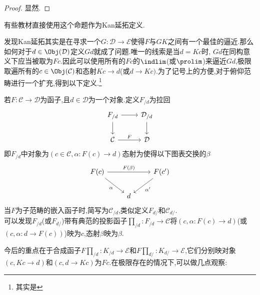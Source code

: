 \begin{proof}
    显然.
\end{proof}
\begin{remark}
    有些教材直接使用这个命题作为Kan延拓定义.
\end{remark}
发现Kan延拓其实是在寻求一个$G : \mathcal{D} \to \mathcal{E}$使得$F$与$GK$之间有一个最佳的逼近.那么如何对于$d \in \Obj(\mathcal{D})$定义$Gd$就成了问题.唯一的线索是当$d = Kc$时, $Gd$在同构意义下应当被取为$Fc$.因此可以使用所有的$Fc$的$\indlim$(或$\prolim$)来逼近$Gd$,极限取遍所有的$c \in \Obj(\mathcal{C})$和态射$Kc \to d$(或$d \to Kc)$.为了记号上的方便,对于俯仰范畴进行一个扩充,得到以下定义.\footnote{其实是\parencite[定义1.6.2]{李文威卷二}}
\begin{definition}
    若$F : \mathcal{C} \to \mathcal{D}$为函子,且$d \in \mathcal{D}$为一个对象.定义$F_{/d}$为拉回
    \[\begin{tikzcd}
	{F_{/d}} & {\mathcal{D}_{/d}} \\
	{\mathcal{C}} & {\mathcal{D}}
	\arrow[from=1-1, to=1-2]
	\arrow[from=1-1, to=2-1]
	\arrow[from=1-2, to=2-2]
	\arrow["F", from=2-1, to=2-2]
    \end{tikzcd}\]
    即$F_{/d}$中对象为$(c\in \mathcal{C},\alpha : F(c) \to d)$态射为使得以下图表交换的$\beta$
    \[\begin{tikzcd}
	{F(c)} && {F(c')} \\
	& d
	\arrow["{F(\beta)}", from=1-1, to=1-3]
	\arrow["\alpha"', from=1-1, to=2-2]
	\arrow["{\alpha'}", from=1-3, to=2-2]
    \end{tikzcd}\]
    当$F$为子范畴的嵌入函子时,简写为$\mathcal{C}_{/d}$,类似定义$F_{d/}$和$\mathcal{C}_{d/}$.\\
    可以发现$F_{/d}$(或$F_{d/}$)带有典范的投影函子$\prod_{/d}: F_{/d} \to \mathcal{C}$将$(c,\alpha: F(c) \to d)$(或$(c,\alpha:d \to F(c))$)映为$c$,态射$\beta$映为$\beta$.
\end{definition}
今后的重点在于合成函子$F \prod_{/d}: K_{/d} \to \mathcal{E}$和$F\prod_{d/}: K_{d/} \to \mathcal{E}$,它们分别映对象$(c,Kc \to d)$和$(c,d \to Kc)$为$Fc$.在极限存在的情况下,可以做几点观察:
